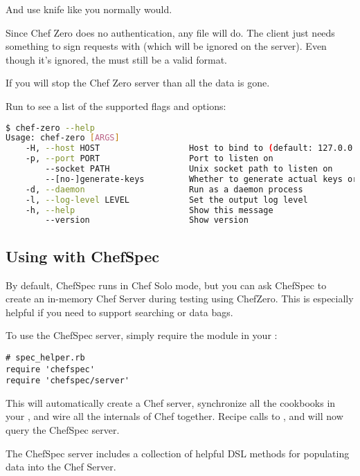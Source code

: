 And use knife like you normally would.

Since Chef Zero does no authentication, any  file will do. The client just needs something to sign requests with (which will be ignored on the server). Even though it's ignored, the  must still be a valid format.

If you will stop the Chef Zero server than all the data is gone.

Run  to see a list of the supported flags and options:

\begin{lstlisting}[language=Bash,label=lst:testing-chef-zero4]
$ chef-zero --help
Usage: chef-zero [ARGS]
    -H, --host HOST                  Host to bind to (default: 127.0.0.1)
    -p, --port PORT                  Port to listen on
        --socket PATH                Unix socket path to listen on
        --[no-]generate-keys         Whether to generate actual keys or fake it (faster).  Default: false.
    -d, --daemon                     Run as a daemon process
    -l, --log-level LEVEL            Set the output log level
    -h, --help                       Show this message
        --version                    Show version
\end{lstlisting}


\subsection{Using with ChefSpec}

By default, ChefSpec runs in Chef Solo mode, but you can ask ChefSpec to create an in-memory Chef Server during testing using ChefZero. This is especially helpful if you need to support searching or data bags.

To use the ChefSpec server, simply require the module in your :

\begin{lstlisting}[label=lst:testing-chef-zero5]
# spec_helper.rb
require 'chefspec'
require 'chefspec/server'
\end{lstlisting}

This will automatically create a Chef server, synchronize all the cookbooks in your , and wire all the internals of Chef together. Recipe calls to ,  and  will now query the ChefSpec server.

The ChefSpec server includes a collection of helpful DSL methods for populating data into the Chef Server.

